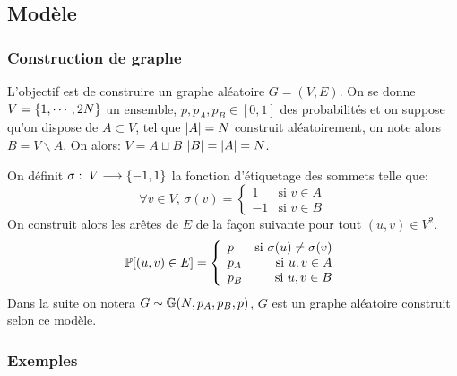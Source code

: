 \documentclass{standalone}
\begin{document}
\subsection{Modèle}
	\subsubsection{Construction de graphe}
	
	\begin{defn}[Modèle 1]
		\label{model}
		L'objectif est de construire un graphe aléatoire $G=(V,E)$. On se donne $V = \left\{ 1, \cdots, 2N\right\}$ un ensemble, $p, p_A, p_B \in [0,1]$ des probabilités et on suppose qu'on dispose de $A \subset V$, tel que $\left| A\right| = N$ construit  aléatoirement, on note alors $B = V \backslash A$. On alors: $V = A \sqcup B$ $\left| B\right| = \left| A\right| = N$.
		
		On définit $\sigma:\; V \longrightarrow \left\{ -1, 1\right\}$ la fonction d'étiquetage des sommets telle que:		
		\[ 
		\forall v \in V,\, \sigma(v) = \left\{ \begin{array}{lr}
			1& \text{si } v \in A\\
			-1& \text{si } v \in B
		\end{array}\right.
		\]		
		On construit alors les arêtes de $E$ de la façon suivante pour tout $(u,v) \in V^2$.
		\[
		\mathbb P[(u,v) \in E] = \left\{ \begin{array}{lr}
		p& \text{si } \sigma(u) \not= \sigma(v)\\
		p_A& \text{si } u,v \in A\\
		p_B& \text{si } u,v \in B
		\end{array}\right.
		\]		
		Dans la suite on notera $G \sim \mathbb G(N, p_A, p_B, p)$, $G$ est un graphe aléatoire construit selon ce modèle.
	\end{defn}
	
	\subsubsection{Exemples}
	
\end{document}
